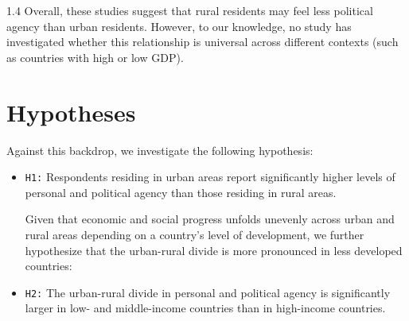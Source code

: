 \documentclass[10pt, letterpaper]{article}
\begin{document}
\begin{spacing}{1.4}
Overall, these studies suggest that rural residents may feel less political agency than urban residents. %
However, to our knowledge, no study has investigated whether this relationship is universal across different contexts (such as countries with high or low GDP).

\section{Hypotheses}

Against this backdrop, we investigate the following hypothesis:\\

\begin{itemize}
    \item[] \texttt{H1:} Respondents residing in urban areas report significantly higher levels of personal and political agency than those residing in rural areas.

Given that economic and social progress unfolds unevenly across urban and rural areas depending on a country's level of development, we further hypothesize that the urban-rural divide is more pronounced in less developed countries:

\item[] \texttt{H2:} The urban-rural divide in personal and political agency is significantly larger in low- and middle-income countries than in high-income countries.
  

\end{itemize}
\end{spacing}
\end{document}
